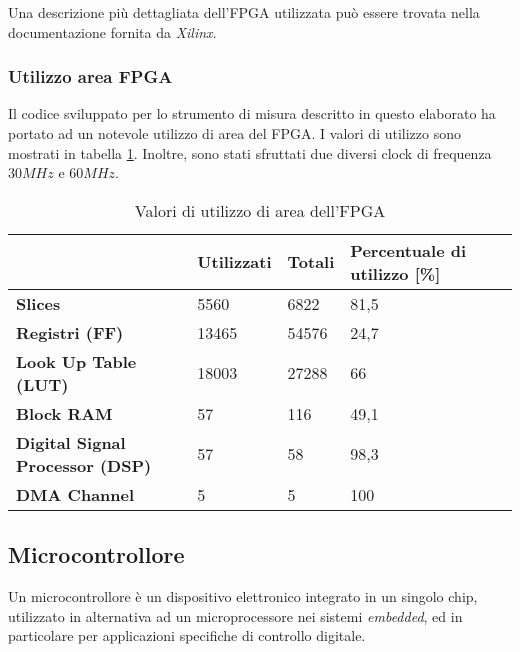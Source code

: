 Una descrizione più dettagliata dell'FPGA utilizzata può essere trovata nella documentazione fornita da \textit{Xilinx}\cite{dsxilinx}.

\subsubsection{Utilizzo area FPGA}
Il codice sviluppato per lo strumento di misura descritto in questo elaborato ha portato ad un notevole utilizzo di area del FPGA. I valori di utilizzo sono mostrati in tabella \ref{tabarea}. Inoltre, sono stati sfruttati due diversi clock di frequenza $30MHz$ e $60MHz$.

\begin{table}[ht]
\centering
\begin{tabular}{l|l|l|l}
                                        & \textbf{Utilizzati} & \textbf{Totali} & \textbf{Percentuale di utilizzo {[}\%{]}} \\ \hline
\textbf{Slices}                         & 5560                & 6822            & 81,5                                      \\
\textbf{Registri (FF)}                  & 13465               & 54576           & 24,7                                      \\
\textbf{Look Up Table (LUT)}            & 18003               & 27288           & 66                                        \\
\textbf{Block RAM}                      & 57                  & 116             & 49,1                                      \\
\textbf{Digital Signal Processor (DSP)} & 57                  & 58              & 98,3                                      \\
\textbf{DMA Channel}                    & 5                   & 5               & 100                                      
\end{tabular}
\caption{Valori di utilizzo di area dell'FPGA}
\label{tabarea}
\end{table}

\subsection{Microcontrollore}
Un microcontrollore è un dispositivo elettronico integrato in un singolo chip, utilizzato in alternativa ad un microprocessore nei sistemi \textit{embedded}, ed in particolare per applicazioni specifiche di controllo digitale.

